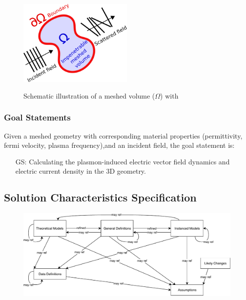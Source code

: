 \documentclass[12pt]{article}
\newcounter{goalnum} %
\begin{document}
	
	\begin{figure}[h!] \begin{center} %
			{ \includegraphics[width=0.5\textwidth]{physical_system.png} }
			\caption{\label{fig:system} Schematic illustration of a meshed volume
				($\Omega$) with  } \end{center} \end{figure}
	
	\subsubsection{Goal Statements} \label{goalstat} Given a meshed geometry with
	corresponding material properties (permittivity, fermi velocity, plasma
	frequency),and an incident field, the goal statement is:
	
	
	\begin{itemize}
		
		\item[GS\refstepcounter{goalnum}\thegoalnum \label{GS1}:] Calculating the
		plasmon-induced electric vector field dynamics and electric current density in
		the 3D geometry.
		
	\end{itemize}
	
	\subsection{Solution Characteristics Specification}
	
	\begin{figure}[H] \includegraphics[scale=0.9]{RelationsBetweenTM_GD_IM_DD_A.pdf}
	\end{figure}
	
\end{document}
